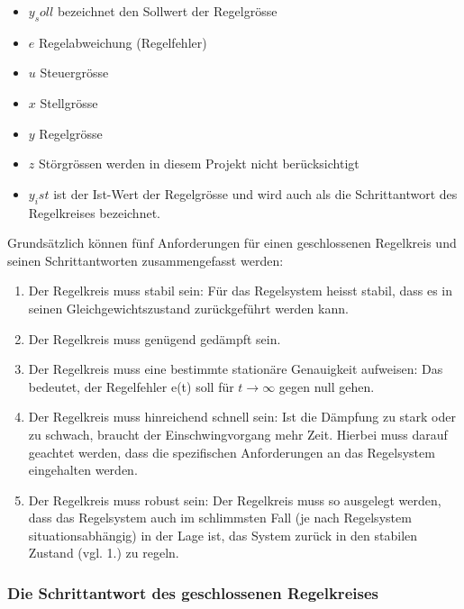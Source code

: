 \begin{itemize}
    \item
        $y_soll$ bezeichnet den Sollwert der Regelgr\"osse
    \item
        $e$ Regelabweichung (Regelfehler)
    \item
        $u$ Steuergr\"osse
    \item
        $x$ Stellgr\"osse
    \item
        $y$ Regelgr\"osse
    \item
        $z$ St\"orgr\"ossen werden in diesem Projekt nicht ber\"ucksichtigt
    \item
        $y_ist$  ist der  Ist-Wert der  Regelgr\"osse  und wird  auch als  die
        Schrittantwort des Regelkreises bezeichnet.
\end{itemize}


Grunds\"atzlich  k\"onnen  f\"unf   Anforderungen  f\"ur  einen  geschlossenen
Regelkreis und seinen Schrittantworten zusammengefasst werden:
\begin{enumerate}
    \item
        Der Regelkreis muss stabil  sein: F\"ur das Regelsystem heisst stabil,
        dass es in seinen Gleichgewichtszustand zur\"uckgef\"uhrt werden kann.
    \item
        Der Regelkreis muss gen\"ugend ged\"ampft sein.
    \item
        Der   Regelkreis   muss   eine  bestimmte   station\"are   Genauigkeit
        aufweisen: Das   bedeutet,    der   Regelfehler   e(t)    soll   f\"ur
        $t\rightarrow\infty$ gegen null gehen.
    \item
        Der  Regelkreis  muss  hinreichend schnell  sein: Ist  die  D\"ampfung
        zu  stark   oder  zu  schwach,  braucht   der  Einschwingvorgang  mehr
        Zeit. Hierbei  muss  darauf  geachtet werden,  dass  die  spezifischen
        Anforderungen an das Regelsystem eingehalten werden.
    \item
        Der  Regelkreis muss  robust  sein: Der Regelkreis  muss so  ausgelegt
        werden,  dass  das  Regelsystem  auch im  schlimmsten  Fall  (je  nach
        Regelsystem situationsabh\"angig) in der Lage ist, das System zur\"uck
        in den stabilen Zustand (vgl. 1.) zu regeln.
\end{enumerate}

\subsubsection{Die Schrittantwort des geschlossenen Regelkreises}

